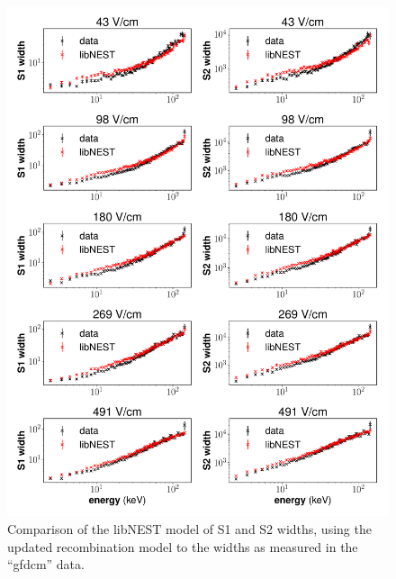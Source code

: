 \begin{figure}[h!]
\centering
  \includegraphics[width=\textwidth]{Figures/sigR_fieldvar_gfdcm.pdf}
\caption{Comparison of the libNEST model of S1 and S2 widths, using the updated recombination model to the widths as measured in the ``gfdcm'' data. }
\label{fig:sigR_fieldvar_gfdcm}
\end{figure}
